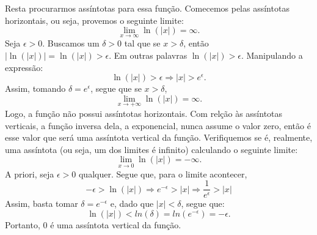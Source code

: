 \begin{proof*}
	Resta procurarmos ass\'intotas para essa fun\c c\~ao. Comecemos pelas ass\'intotas horizontais,
	ou seja, provemos o seguinte limite:
	$$
		\lim_{x\to\infty} \ln(|x|) = \infty.
	$$
	Seja $\epsilon > 0$. Buscamos um $\delta > 0$ tal que se $x > \delta$, ent\~ao $|\ln(|x|)| = \ln(|x|) > \epsilon$.
	Em outras palavras $\ln(|x|) > \epsilon$. Manipulando a express\~ao:
	$$
		\ln(|x|) > \epsilon \Rightarrow |x| >  e^{\epsilon}.
	$$
	Assim, tomando $\delta = e^{\epsilon}$, segue que se $x > \delta$,
	$$
		\lim_{x\to+\infty}\ln(|x|) = \infty.
	$$
	Logo, a fun\c c\~ao n\~ao possui ass\'intotas horizontais. Com rel\c c\~ao \`as ass\'intotas
	verticais, a fun\c c\~ao inversa dela, a exponencial, nunca assume o valor zero, ent\~ao \'e esse valor
	que ser\'a uma ass\'intota vertical da fun\c c\~ao. Verifiquemos se \'e, realmente, uma ass\'intota (ou seja, um dos 
	limites \'e infinito) calculando o seguinte limite:
	$$
		\lim_{x\to0}\ln(|x|) = -\infty.
	$$
	A priori, seja $\epsilon > 0$ qualquer. Segue que, para o limite acontecer, 
	$$
		-\epsilon > \ln(|x|) \Rightarrow e^{-\epsilon} > |x| \Rightarrow \frac{1}{e^{\epsilon}} > |x| 
	$$
	Assim, basta tomar $\delta = e^{-\epsilon}$ e, dado que $|x| < \delta$, segue que:
	$$
		\ln(|x|) < ln(\delta) = ln(e^{-\epsilon}) = -\epsilon.
	$$
	Portanto, 0 \'e uma ass\'intota vertical da fun\c c\~ao.
\end{proof*}

